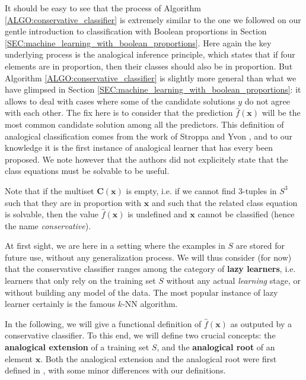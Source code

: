 It should be easy to see that the process of Algorithm
\ref{ALGO:conservative_classifier} is extremely similar to the one we followed
on our gentle introduction to classification with Boolean proportions in
Section \ref{SEC:machine_learning_with_boolean_proportions}. Here again the key
underlying process is the analogical inference principle, which states that if
four elements are in proportion, then their classes should also be in
proportion. But Algorithm \ref{ALGO:conservative_classifier} is slightly more
general than what we have glimpsed in Section
\ref{SEC:machine_learning_with_boolean_proportions}: it allows to deal with
cases where some of the candidate solutions $y$ do not agree with each other.
The fix here is to consider that the prediction $\hat{f}(\mathbf{x})$ will be
the most common candidate solution among all the predictors. This definition of
analogical classification comes from the work of Stroppa and Yvon
\cite{StrYvoCNLL05, StrYvoREPORT05}, and to our knowledge it is the first
instance of analogical learner that has every been proposed. We note however
that the authors did not explicitely state that the class equations must be
solvable to be useful.

Note that if the multiset $\mathbf{C}(\mathbf{x})$ is empty, i.e. if we cannot find
$3$-tuples in $S^3$ such that they are in proportion with $\mathbf{x}$ and such
that the related class equation is solvable, then the value
$\hat{f}(\mathbf{x})$  is undefined and $\mathbf{x}$ cannot be classified
(hence the name \textit{conservative}).

At first sight, we are here in a setting where the examples in $S$ are stored
for future use, without any generalization process.  We will thus consider (for
now) that the conservative classifier ranges among the category of
\textbf{lazy learners}, i.e. learners that only rely on the training set $S$
without any actual \textit{learning} stage, or without building any model of
the data. The most popular instance of lazy learner certainly is the famous
$k$-NN algorithm.

In the following, we will give a functional definition of $\hat{f}(\mathbf{x})$
as outputed by a conservative classifier. To this end, we will define two
crucial concepts: the \textbf{analogical extension} of a training set $S$, and
the \textbf{analogical root} of an element $\mathbf{x}$. Both the analogical
extension and the analogical root were first defined in \cite{StrYvoREPORT05},
with some minor differences with our definitions.

